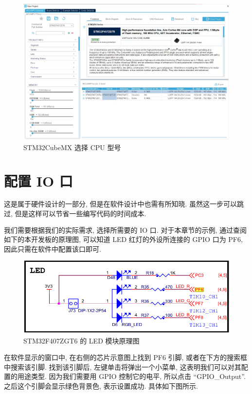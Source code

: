 \begin{figure}[H]
    \centering
    \includegraphics[width=\textwidth]{images/1-newproj-selectmodel.jpg}
    \caption{STM32CubeMX 选择 CPU 型号}
\end{figure}

\section{配置 IO 口}
这是属于硬件设计的一部分, 但是在软件设计中也需有所知晓. 虽然这一步可以跳过, 但是这样可以节省一些编写代码的时间成本.

我们需要根据我们的实际需求, 选择所需要的 IO 口. 对于本章节的示例, 通过查阅如下的本开发板的原理图, 可以知道 LED 红灯的外设所连接的 GPIO 口为 PF6, 因此只需在软件中配置该口即可.

\begin{figure}[H]
    \centering
    \includegraphics[width=.8\textwidth]{images/1-newproj-led.png}
    \caption{STM32F407ZGT6 的 LED 模块原理图}
\end{figure}

在软件显示的窗口中, 在右侧的芯片示意图上找到 PF6 引脚, 或者在下方的搜索框中搜索该引脚. 找到该引脚后, 左键单击将弹出一个小菜单, 这表明我们可以对其配置的用途类型. 因为我们需要用 GPIO 控制它的电平, 所以点击 ``GPIO\_Output''. 之后这个引脚会显示绿色背景色, 表示设置成功. 具体如下图所示.

